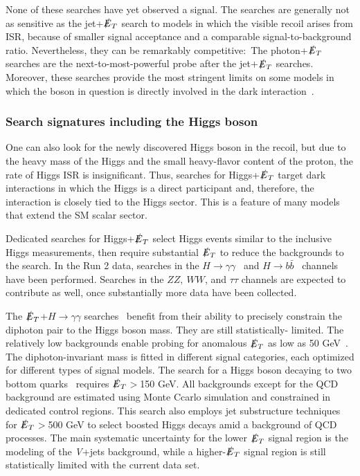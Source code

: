 \documentclass{ar-1col}
\newcommand{\MET}{\ensuremath{\slashed{E}_T}\xspace}
\begin{document}
None of these searches have yet observed a signal. The searches are generally not
as sensitive as the jet+\MET search to models in which the
visible recoil arises from ISR, because of smaller signal
acceptance and a comparable signal-to-background ratio. Nevertheless, they can
be remarkably competitive:\ The
photon+\MET searches are the next-to-most-powerful probe after the jet+\MET searches. Moreover,
these searches provide the most stringent limits on some models
in which the boson in question is directly involved in the dark
interaction~\cite{Berlin:2014cfa}.

\subsubsection{Search signatures including the Higgs boson}

One can also look for the newly discovered Higgs boson in the
recoil, but due to the heavy mass of the Higgs and the small
heavy-flavor content of the proton, the rate of Higgs ISR is
insignificant. Thus, searches for Higgs+\MET target dark
interactions in which the Higgs is a direct participant and,
therefore, the interaction is closely tied to the Higgs sector.
This is a feature of many models that extend the SM scalar sector.

Dedicated searches for Higgs+\MET  select Higgs events similar to
the inclusive Higgs measurements, then require substantial \MET to
reduce the backgrounds to the search. In the Run 2 data, searches
in the $H \rightarrow
\gamma\gamma$~\cite{CMS-PAS-EXO-16-054,Aaboud:2017uak} and $H
\rightarrow b\bar{b}$~\cite{Aaboud:2017yqz} channels have been
performed. Searches in the $ZZ,~WW$, and $\tau\tau$ channels are
expected to contribute as well, once substantially more data have been
collected.

The \MET+$H \rightarrow \gamma\gamma$
searches~\cite{CMS-PAS-EXO-16-054,Aaboud:2017uak} benefit from
their ability to precisely constrain the diphoton pair to the
Higgs boson mass. They are still statistically- limited. The
relatively low backgrounds enable probing for anomalous \MET as low
as 50 GeV~\cite{CMS-PAS-EXO-16-054}. The diphoton-invariant mass
is fitted in different signal categories, each optimized for
different types of signal models. The search for a Higgs boson decaying to
two bottom quarks~\cite{Aaboud:2017yqz} requires \MET$>$150 GeV.
All backgrounds except for the QCD background are estimated using
Monte Ccarlo simulation and constrained in dedicated control regions. This search
also employs jet substructure techniques for \MET$>$500 GeV to
select boosted Higgs decays amid a background of QCD processes.
The main systematic uncertainty for the lower \MET signal region
is the modeling of the \textit{V}+jets background, while a higher-\MET
signal region is still statistically limited with the current
data set.
\end{document}
